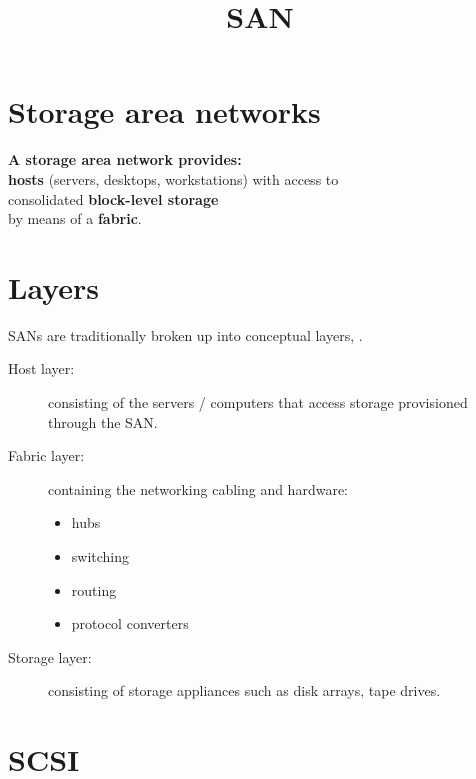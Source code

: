 \documentclass[slides]{pgnotes}
\title{SAN}
\begin{document}
\maketitle

\section{Storage area networks}

\begin{center}
\textbf{A storage area network provides:}\\
\textbf{hosts} (servers, desktops, workstations) with access to\\
consolidated \textbf{block-level storage}\\
by means of a \textbf{fabric}.
\end{center}


\section{Layers}
\label{sec:ip-san-layers}

SANs are traditionally broken up into conceptual layers, .

\begin{description}
\item[Host layer:]
consisting of the servers / computers that access storage provisioned
through the SAN.
\item[Fabric layer:]
  containing the networking cabling and hardware:
  \begin{itemize}
  \item hubs
  \item switching
  \item routing
  \item protocol converters
  \end{itemize}
\item[Storage layer:]
consisting of storage appliances such as disk arrays, tape drives.
\end{description}




\section{SCSI}
\label{sec:scsi}
\end{document}
